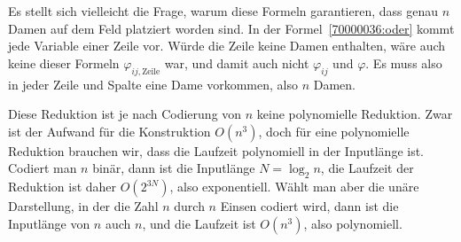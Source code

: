 \begin{diskussion}
Es stellt sich vielleicht die Frage, warum diese Formeln garantieren, dass
genau $n$ Damen auf dem Feld platziert worden sind.
In der Formel~\eqref{70000036:oder} kommt jede Variable einer Zeile vor.
Würde die Zeile keine Damen enthalten, wäre auch keine dieser
Formeln $\varphi_{ij,\text{Zeile}}$ war, und damit auch nicht $\varphi_{ij}$
und $\varphi$.
Es muss also in jeder Zeile und Spalte eine Dame vorkommen, also $n$
Damen.

Diese Reduktion ist je nach Codierung von $n$ keine polynomielle Reduktion.
Zwar ist der Aufwand für die Konstruktion $O(n^3)$, doch für eine
polynomielle Reduktion brauchen wir, dass die Laufzeit polynomiell in
der Inputlänge ist.
Codiert man $n$ binär, dann ist die Inputlänge $N=\log_2n$, die Laufzeit
der Reduktion ist daher $O(2^{3N})$, also exponentiell.
Wählt man aber die unäre Darstellung, in der die Zahl $n$ durch $n$ Einsen
codiert wird, dann ist die Inputlänge von $n$ auch $n$, und die Laufzeit
ist $O(n^ 3)$, also polynomiell.
\end{diskussion}


